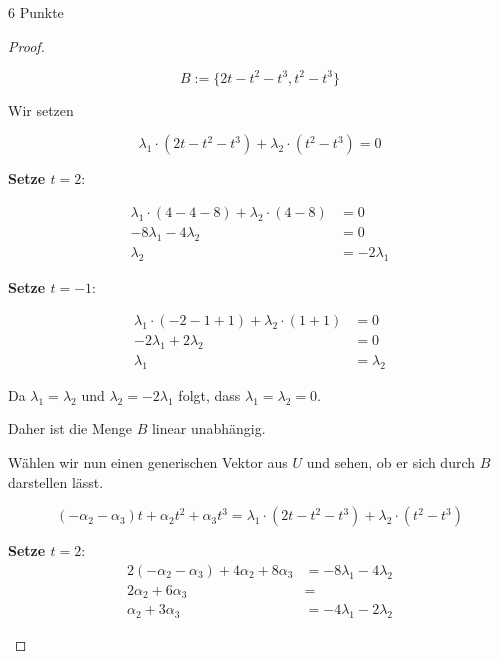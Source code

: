 \documentclass{problemset}
\begin{document}
\begin{problem}{6 Punkte}
\begin{proof}
\begin{enumerate}
              \[
                  B := \{2t - t^2 - t^3, t^2 - t^3\}
              \]

              Wir setzen

              \[
                  \lambda_1 \cdot (2t - t^2 - t^3) + \lambda_2 \cdot (t^2 - t^3) = 0
              \]

              \textbf{Setze $t = 2$}:

              \begin{align*}
                  \lambda_1 \cdot (4 - 4 - 8) + \lambda_2 \cdot (4 - 8) & = 0            \\
                  -8 \lambda_1 - 4 \lambda_2                            & = 0            \\
                  \lambda_2                                             & = -2 \lambda_1
              \end{align*}

              \textbf{Setze $t = -1$}:

              \begin{align*}
                  \lambda_1 \cdot (-2 - 1 + 1) + \lambda_2 \cdot (1 + 1) & = 0         \\
                  -2 \lambda_1 + 2 \lambda_2                             & = 0         \\
                  \lambda_1                                              & = \lambda_2
              \end{align*}

              Da $\lambda_1 = \lambda_2$ und $\lambda_2 = -2 \lambda_1$ folgt,
              dass $\lambda_1 = \lambda_2 = 0$.

              Daher ist die Menge $B$ linear unabhängig.

              Wählen wir nun einen generischen Vektor aus $U$ und sehen, ob er
              sich durch $B$ darstellen lässt.

              \[
                  (-\alpha_2 - \alpha_3)t + \alpha_2t^2 + \alpha_3t^3 = \lambda_1 \cdot (2t - t^2 - t^3) + \lambda_2 \cdot (t^2 - t^3)
              \]

              \textbf{Setze $t = 2$}:
              \begin{align*}
                  2(-\alpha_2 - \alpha_3) + 4\alpha_2 + 8\alpha_3 & = -8 \lambda_1 - 4 \lambda_2 \\
                  2\alpha_2 + 6\alpha_3                           & =                            \\
                  \alpha_2 + 3\alpha_3                            & = -4 \lambda_1 - 2 \lambda_2
              \end{align*}


\end{enumerate}
\end{proof}
\end{problem}
\end{document}
